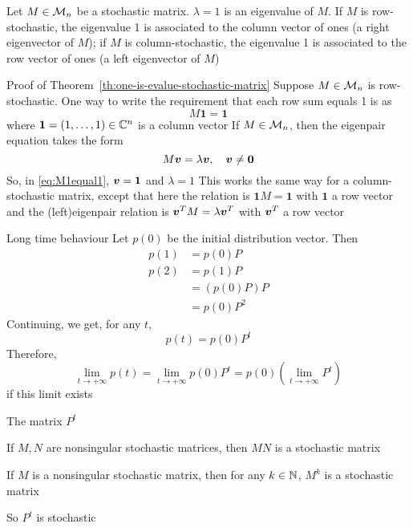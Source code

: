\documentclass[aspectratio=169]{beamer}\usepackage[]{graphicx}\usepackage[]{xcolor}
\begin{document}
\begin{frame}
\begin{importanttheorem}
\label{th:one-is-evalue-stochastic-matrix}
Let $M\in\mathcal{M}_n$ be a stochastic matrix. $\lambda =1$ is an eigenvalue of $M$. 
If $M$ is row-stochastic, the eigenvalue 1 is associated to the column vector of ones (a right eigenvector of $M$); if $M$ is column-stochastic, the eigenvalue 1 is associated to the row vector of ones (a left eigenvector of $M$)
\end{importanttheorem}
\end{frame}

\begin{frame}[red]{Proof of Theorem~\ref{th:one-is-evalue-stochastic-matrix}}
Suppose $M\in\mathcal{M}_n$ is row-stochastic. One way to write the requirement that each row sum equals 1 is as 
\begin{equation}\label{eq:M1equal1}
M\mathbf{1}=\mathbf{1}
\end{equation}
where $\mathbf{1}=(1,\ldots,1)\in\mathbb{C}^n$ is a column vector
\vfill
If $M\in\mathcal{M}_n$, then the eigenpair equation takes the form
\[
M\bv=\lambda\bv,\quad \bv\neq\b0
\]
So, in \eqref{eq:M1equal1}, $\bm{v}=\mathbf{1}$ and $\lambda=1$
\vfill
This works the same way for a column-stochastic matrix, except that here the relation is $\mathbf{1}M=\mathbf{1}$ with $\mathbf{1}$ a row vector and the (left)eigenpair relation is $\bm{v}^TM=\lambda\bm{v}^T$ with $\bm{v}^T$ a row vector
\end{frame}

\begin{frame}{Long time behaviour}
Let $p(0)$ be the initial distribution vector. Then
\begin{align*}
p(1) &= p(0)P \\
p(2) &= p(1)P\\
&= \left(p(0)P\right)P \\
&= p(0)P^2
\end{align*}
\vfill
Continuing, we get, for any $t$,
\[
p(t)=p(0)P^t
\]
\vfill
Therefore, 
\[
\lim_{t\rightarrow +\infty}p(t) =
\lim_{t\rightarrow +\infty}p(0)P^t =
p(0)\left(\lim_{t\rightarrow +\infty}P^t\right)
\]
if this limit exists
\end{frame}


\begin{frame}{The matrix $P^t$}
\begin{theorem}
If $M,N$ are nonsingular stochastic matrices, then $MN$ is a stochastic matrix
\end{theorem}
\vfill
\begin{corollary}
If $M$ is a nonsingular stochastic matrix, then for any $k\in\mathbb{N}$, $M^k$ is a stochastic matrix
\end{corollary}
\vfill
So $P^t$ is stochastic
\end{frame}
\end{document}
